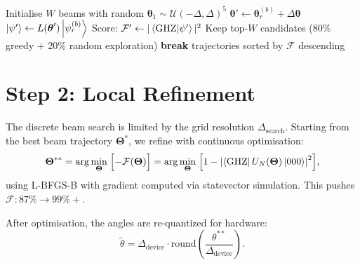 \documentclass[11pt,a4paper]{article}
\begin{document}
\begin{algorithm}
\caption{Forward Beam Search for GHZ Preparation}
\begin{algorithmic}[1]
\State Initialise $W$ beams with random $\boldsymbol{\theta}_1 \sim \mathcal{U}(-\Delta, \Delta)^5$
            \State $\boldsymbol{\theta}' \leftarrow \boldsymbol{\theta}_r^{(b)} + \Delta\boldsymbol{\theta}$
            \State $\ket{\psi'} \leftarrow L(\boldsymbol{\theta}')\ket{\psi_r^{(b)}}$
            \State Score: $\mathcal{F}' \leftarrow |\braket{\mathrm{GHZ}}{\psi'}|^2$
        \EndFor
    \EndFor
    \State Keep top-$W$ candidates (80\% greedy + 20\% random exploration)
     \textbf{break} \EndIf
\EndFor
\State \Return trajectories sorted by $\mathcal{F}$ descending
\end{algorithmic}
\end{algorithm}

\section{Step 2: Local Refinement}\label{sec:refinement}

The discrete beam search is limited by the grid resolution $\Delta_{\mathrm{search}}$.
Starting from the best beam trajectory $\boldsymbol{\Theta}^*$, we refine with
continuous optimisation:
\begin{equation}
    \boldsymbol{\Theta}^{**} = \arg\min_{\boldsymbol{\Theta}}
    \;\Bigl[-\mathcal{F}(\boldsymbol{\Theta})\Bigr]
    = \arg\min_{\boldsymbol{\Theta}}
    \;\Bigl[1 - \left|\bra{\text{GHZ}} U_N(\boldsymbol{\Theta})\ket{000}\right|^2\Bigr],
\end{equation}
using L-BFGS-B with gradient computed via statevector simulation.
This pushes $\mathcal{F}: 87\% \to 99\%+$.

After optimisation, the angles are re-quantized for hardware:
\begin{equation}
    \tilde{\theta} = \Delta_{\mathrm{device}}\cdot \mathrm{round}\!\left(\frac{\theta^{**}}{\Delta_{\mathrm{device}}}\right).
\end{equation}

\end{document}

